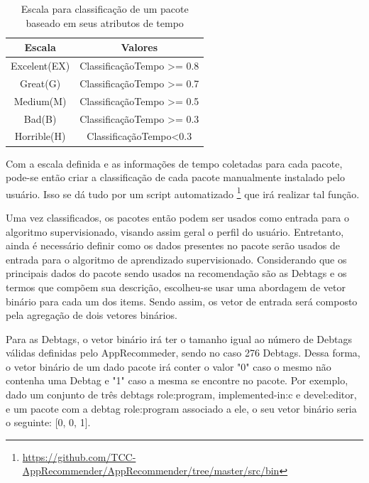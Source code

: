 \begin{table}[h]
\centering
\begin{tabular}{cc}
\hline
\rowcolor[HTML]{EFEFEF}
{Escala} & {Valores} \\ \hline
{Excelent(EX)}  & ClassificaçãoTempo >= 0.8                  \\ \hline
{Great(G)}   & ClassificaçãoTempo >= 0.7                  \\ \hline
{Medium(M)}   & ClassificaçãoTempo >= 0.5                  \\ \hline
{Bad(B)}   & ClassificaçãoTempo >= 0.3                  \\ \hline
{Horrible(H)}   &ClassificaçãoTempo<0.3                   \\ \hline
\end{tabular}
\caption{Escala para classificação de um pacote baseado em seus atributos de tempo}
\label{tab:classificacao_pacotes}
\end{table}


Com a escala definida e as informações de tempo coletadas para cada pacote,
pode-se então criar a classificação de cada pacote manualmente instalado pelo
usuário.
Isso se dá tudo por um script automatizado \footnote{\url{https://github.com/TCC-AppRecommender/AppRecommender/tree/master/src/bin}}
que irá realizar tal função.

Uma vez classificados, os pacotes então podem ser usados como entrada para o
algoritmo supervisionado, visando assim geral o perfil do usuário.
Entretanto, ainda é necessário definir como os dados presentes no pacote serão usados de entrada para o
algoritmo de aprendizado supervisionado. Considerando que os principais dados do pacote sendo usados na
recomendação são as Debtags e os termos que compõem sua descrição, escolheu-se usar uma abordagem de
vetor binário para cada um dos items. Sendo assim, os vetor de entrada será composto pela agregação de dois vetores
binários.

Para as Debtags, o vetor binário irá ter o tamanho igual ao número de Debtags
válidas definidas pelo AppRecommeder, sendo no caso 276 Debtags. Dessa forma,
o vetor binário de um dado pacote irá conter o valor "0" caso o mesmo não
contenha uma Debtag e "1" caso a mesma se encontre
no pacote. Por exemplo, dado um conjunto de três debtags role:program, implemented-in:c e devel:editor, e um pacote com a debtag
role:program associado a ele, o seu vetor binário seria o seguinte: [0, 0, 1].

